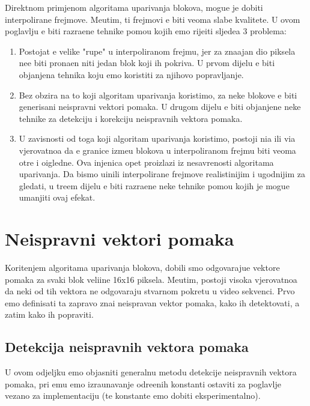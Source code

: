 Direktnom primjenom algoritama uparivanja blokova, mogu\cj e je dobiti interpolirane frejmove. Me\dj utim, ti frejmovi \cj e biti veoma slabe kvalitete. U ovom poglavlju \cj e biti razra\dj ene tehnike pomo\cj u kojih
\cj emo rije\sh iti sljede\cj a 3 problema:
\begin{enumerate}
	\item Postojat \cj e velike "rupe" u interpoliranom frejmu, jer za zna\ch ajan dio piksela ne\cj e biti prona\dj en niti jedan blok koji ih pokriva. U prvom dijelu \cj e biti obja\sh njena tehnika koju \cj emo koristiti
	za njihovo popravljanje.
	\item Bez obzira na to koji algoritam uparivanja koristimo, za neke blokove \cj e biti generisani neispravni vektori pomaka. U drugom dijelu \cj e biti obja\sh njene neke tehnike za detekciju i korekciju
	neispravnih vektora pomaka.
	\item U zavisnosti od toga koji algoritam uparivanja koristimo, postoji ni\zh a ili vi\sh a vjerovatno\cj a da \cj e granice izme\dj u blokova u interpoliranom frejmu biti veoma o\sh tre i o\ch igledne. Ova 
	\ch injenica opet proizlazi iz nesavr\sh enosti algoritama uparivanja. Da bismo u\ch inili interpolirane frejmove realisti\ch nijim i ugodnijim za gledati, u tre\cj em dijelu \cj e biti razra\dj ene neke tehnike pomo\cj u kojih je
	mogu\cj e umanjiti ovaj efekat.
\end{enumerate}

\section{Neispravni vektori pomaka}
Kori\sh tenjem algoritama uparivanja blokova, dobili smo odgovaraju\cj e vektore pomaka za svaki blok veli\ch ine 16x16 piksela. Me\dj utim, postoji visoka vjerovatno\cj a da neki od tih vektora ne odgovaraju stvarnom pokretu
u video sekvenci. Prvo \cj emo definisati \sh ta zapravo zna\ch i neispravan vektor pomaka, kako ih detektovati, a zatim kako ih popraviti. %

\subsection{Detekcija neispravnih vektora pomaka} %
U ovom odjeljku \cj emo objasniti generalnu metodu detekcije neispravnih vektora pomaka, pri \ch emu \cj emo izra\ch unavanje odre\dj enih konstanti ostaviti za poglavlje vezano za implementaciju (te konstante \cj emo dobiti
eksperimentalno).

